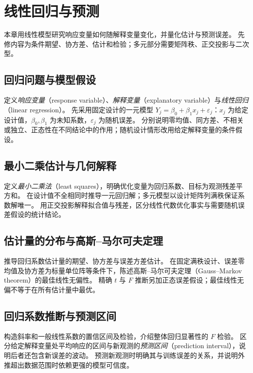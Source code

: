 \setcounter{chapter}{15} %
\chapter{线性回归与预测}
\label{chap:ps-regression}

本章用线性模型研究响应变量如何随解释变量变化，并量化估计与预测误差。
先修内容为条件期望、协方差、估计和检验；多元部分需要矩阵秩、正交投影与二次型。

\section{回归问题与模型假设}
\label{sec:ps-regression-model}
定义\emph{响应变量}（response variable）、\emph{解释变量}（explanatory variable）与\emph{线性回归}（linear regression）。
先采用固定设计的一元模型 $Y_j=\beta_0+\beta_1x_j+\varepsilon_j$：$x_j$ 为给定设计值，$\beta_0,\beta_1$ 为未知系数，$\varepsilon_j$ 为随机误差。
分别说明零均值、同方差、不相关或独立、正态性在不同结论中的作用；随机设计情形改用给定解释变量的条件假设。

\section{最小二乘估计与几何解释}
\label{sec:ps-least-squares}
定义\emph{最小二乘法}（least squares），明确优化变量为回归系数、目标为观测残差平方和。
在设计值不全相同时推导一元回归解；多元模型以设计矩阵列满秩保证系数解唯一。
用正交投影解释拟合值与残差，区分线性代数优化事实与需要随机误差假设的统计结论。

\section{估计量的分布与高斯--马尔可夫定理}
\label{sec:ps-gauss-markov}
推导回归系数估计量的期望、协方差与误差方差估计。
在固定满秩设计、误差零均值及协方差为标量单位阵等条件下，陈述高斯--马尔可夫定理（Gauss--Markov theorem）的最佳线性无偏性。
精确 $t$ 与 $F$ 推断另加正态误差假设；最佳线性无偏不等于在所有估计量中最优。

\section{回归系数推断与预测区间}
\label{sec:ps-regression-inference}
构造斜率和一般线性系数的置信区间及检验，介绍整体回归显著性的 $F$ 检验。
区分给定解释变量处平均响应的区间与新观测的\emph{预测区间}（prediction interval），说明后者还包含新误差的波动。
预测新观测时明确其与训练误差的关系，并说明外推超出数据范围时依赖更强的模型可信度。

